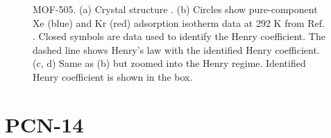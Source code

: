     \begin{figure}[h!]
       \centering
  
       
       \caption{MOF-505. (a) Crystal structure \cite{MOF-505_structure}.
       (b) Circles show pure-component Xe (blue) and Kr (red) adsorption isotherm data at 292 K from Ref. \cite{MOF-505_XeKr}. 
       Closed symbols are data used to identify the Henry coefficient. The dashed line shows Henry's law with the identified Henry coefficient.
       (c, d) Same as (b) but zoomed into the Henry regime. Identified Henry coefficient is shown in the box.}
    \end{figure}
    
    \clearpage
    
    
    \section{PCN-14}
    
